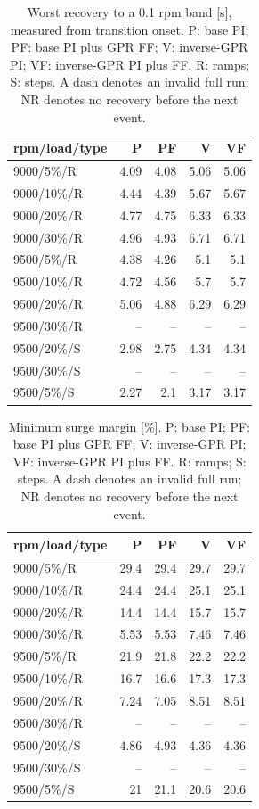 \documentclass[11pt,a4paper]{article}
\begin{document}
\begin{table}[H]\centering\small
\begin{tabular}{@{}lrrrr@{}}\toprule
rpm/load/type & P & PF & V & VF\\\midrule
9000/5\%/R & 4.09 & 4.08 & 5.06 & 5.06\\
9000/10\%/R & 4.44 & 4.39 & 5.67 & 5.67\\
9000/20\%/R & 4.77 & 4.75 & 6.33 & 6.33\\
9000/30\%/R & 4.96 & 4.93 & 6.71 & 6.71\\
9500/5\%/R & 4.38 & 4.26 & 5.1 & 5.1\\
9500/10\%/R & 4.72 & 4.56 & 5.7 & 5.7\\
9500/20\%/R & 5.06 & 4.88 & 6.29 & 6.29\\
9500/30\%/R & -- & -- & -- & --\\
9500/20\%/S & 2.98 & 2.75 & 4.34 & 4.34\\
9500/30\%/S & -- & -- & -- & --\\
9500/5\%/S & 2.27 & 2.1 & 3.17 & 3.17\\
\bottomrule\end{tabular}\caption{Worst recovery to a 0.1 rpm band [s], measured from transition onset. P: base PI; PF: base PI plus GPR FF; V: inverse-GPR PI; VF: inverse-GPR PI plus FF. R: ramps; S: steps. A dash denotes an invalid full run; NR denotes no recovery before the next event.}\end{table}

\begin{table}[H]\centering\small
\begin{tabular}{@{}lrrrr@{}}\toprule
rpm/load/type & P & PF & V & VF\\\midrule
9000/5\%/R & 29.4 & 29.4 & 29.7 & 29.7\\
9000/10\%/R & 24.4 & 24.4 & 25.1 & 25.1\\
9000/20\%/R & 14.4 & 14.4 & 15.7 & 15.7\\
9000/30\%/R & 5.53 & 5.53 & 7.46 & 7.46\\
9500/5\%/R & 21.9 & 21.8 & 22.2 & 22.2\\
9500/10\%/R & 16.7 & 16.6 & 17.3 & 17.3\\
9500/20\%/R & 7.24 & 7.05 & 8.51 & 8.51\\
9500/30\%/R & -- & -- & -- & --\\
9500/20\%/S & 4.86 & 4.93 & 4.36 & 4.36\\
9500/30\%/S & -- & -- & -- & --\\
9500/5\%/S & 21 & 21.1 & 20.6 & 20.6\\
\bottomrule\end{tabular}\caption{Minimum surge margin [\%]. P: base PI; PF: base PI plus GPR FF; V: inverse-GPR PI; VF: inverse-GPR PI plus FF. R: ramps; S: steps. A dash denotes an invalid full run; NR denotes no recovery before the next event.}\end{table}
\end{document}
